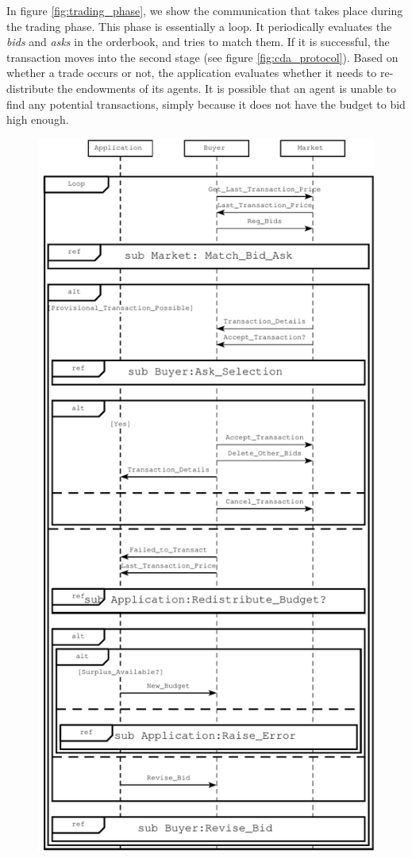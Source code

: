 \documentclass[10pt,journal,compsoc]{IEEEtran}
\begin{document}

In figure \ref{fig:trading_phase}, we show the communication that takes place during the trading phase. This phase is essentially a loop. It periodically evaluates the \textit{bids} and \textit{asks} in the orderbook, and tries to match them. If it is successful, the transaction moves into the second stage (see figure \ref{fig:cda_protocol}). Based on whether a trade occurs or not, the application evaluates whether it needs to re-distribute the endowments of its agents. It is possible that an agent is unable to find any potential transactions, simply because it does not have the budget to bid high enough.

\begin{figure}[h]
\centering
\includegraphics[scale=0.3]{drawings/trading_phase.pdf}

\end{figure}
\end{document}
